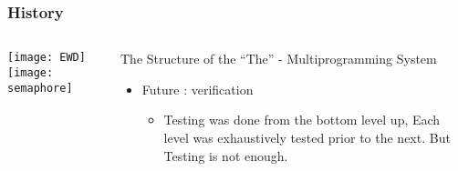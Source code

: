 \begin{frame}[plain]
	\frametitle{History}
	
	
	
	\begin{columns}
		
		\begin{column}{.4\textwidth}
			\centering
			\texttt{[image: EWD]}
			\texttt{[image: semaphore]}
			
			
			
		\end{column}
		
		\begin{column}{.6\textwidth}
			
			The Structure of the “The” - Multiprogramming System
			\begin{itemize}
				\item Future : verification
				
				\begin{itemize}
					\item Testing was done from the bottom level up, Each level was exhaustively tested prior to the next. But Testing is not enough.
					
				\end{itemize}
				
			\end{itemize}	
			
		\end{column}
		
		
	\end{columns}
	
	
\end{frame}


